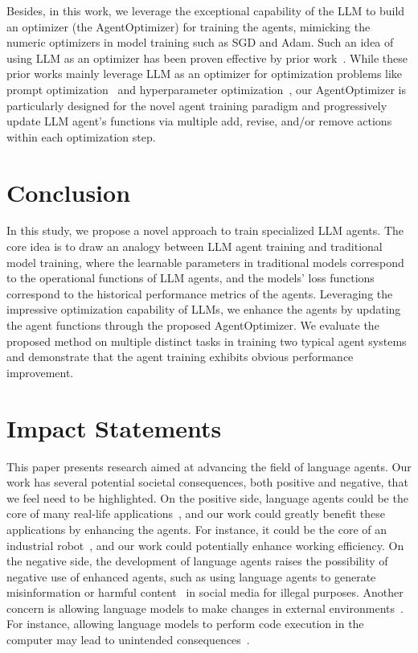 \documentclass{article}
\theoremstyle{plain}
\theoremstyle{definition}
\theoremstyle{remark}
\begin{document}
Besides, in this work, we leverage the exceptional capability of the LLM to build an optimizer (the AgentOptimizer) for training the agents, mimicking the numeric optimizers in model training such as SGD and Adam. Such an idea of using LLM as an optimizer has been proven effective by prior work~\cite{yang2023large, zhang2023using}. 
While these prior works mainly leverage LLM as an optimizer for optimization problems like prompt optimization~\cite{yang2023large} and hyperparameter optimization~\cite{zhang2023using}, our AgentOptimizer is particularly designed for the novel agent training paradigm and progressively update LLM agent's functions via multiple add, revise, and/or remove actions within each optimization step.

\section{Conclusion}

In this study, we propose a novel approach to train specialized LLM agents. 
The core idea is to draw an analogy between LLM agent training and traditional model training, where the learnable parameters in traditional models correspond to the operational functions of LLM agents, and the models' loss functions correspond to the historical performance metrics of the agents. 
Leveraging the impressive optimization capability of LLMs, we enhance the agents by updating the agent functions through the proposed AgentOptimizer. 
We evaluate the proposed method on multiple distinct tasks in training two typical agent systems and demonstrate that the agent training exhibits obvious performance improvement.




\clearpage
\section*{Impact Statements}
This paper presents research aimed at advancing the field of language agents. Our work has several potential societal consequences, both positive and negative, that we feel need to be highlighted.
On the positive side, language agents could be the core of many real-life applications~\cite{hosseini2023exploratory, cai2019hello}, and our work could greatly benefit these applications by enhancing the agents. For instance, it could be the core of an industrial robot~\cite{zeng2023large}, and our work could potentially enhance working efficiency.
On the negative side, the development of language agents raises the possibility of negative use of enhanced agents, such as using language agents to generate misinformation or harmful content~\cite{navigli2023biases} in social media for illegal purposes. Another concern is allowing language models to make changes in external environments~\cite{tian2023evil}. For instance, allowing language models to perform code execution in the computer may lead to unintended consequences~\cite{liu2024empirical}.
\end{document}
